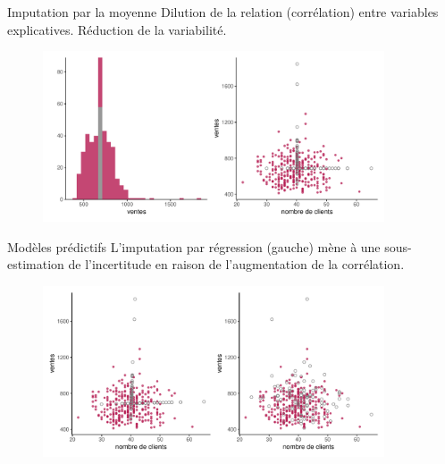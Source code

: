 \documentclass[
  ignorenonframetext,
]{beamer}
\begin{document}
\begin{frame}{Imputation par la moyenne}
\protect\hypertarget{imputation-par-la-moyenne}{}
Dilution de la relation (corrélation) entre variables explicatives.
Réduction de la variabilité.

\begin{figure}

{\centering \includegraphics[width=0.9\textwidth,height=\textheight]{MATH60602-diapos13_files/figure-beamer/unnamed-chunk-2-1.pdf}

}

\end{figure}
\end{frame}

\begin{frame}{Modèles prédictifs}
\protect\hypertarget{moduxe8les-pruxe9dictifs}{}
L'imputation par régression (gauche) mène à une sous-estimation de
l'incertitude en raison de l'augmentation de la corrélation.

\begin{figure}

{\centering \includegraphics[width=0.9\textwidth,height=\textheight]{MATH60602-diapos13_files/figure-beamer/unnamed-chunk-3-1.pdf}

}

\end{figure}
\end{frame}
\end{document}
